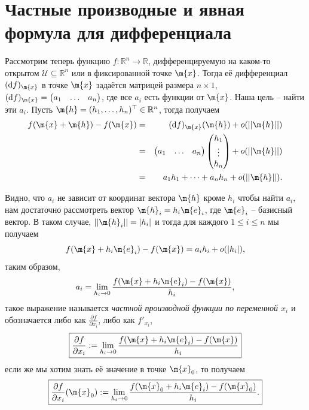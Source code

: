 \section{Частные производные и явная формула для дифференциала}

Рассмотрим теперь функцию $f:\mathbb{R}^n \to \mathbb{R}$, дифференцируемую на каком-то открытом $\mathscr{U} \subseteq \mathbb{R}^n$ или в фиксированной точке $\m{x}$. Тогда её дифференциал $(\mathrm{d}f)_\m{x}$ в точке $\m{x}$ задаётся матрицей размера $n\times 1$, $(\mathrm{d}f)_\m{x} = \begin{pmatrix}
    a_1 & \ldots & a_n
\end{pmatrix}$, где все $a_i$ есть функции от $\m{x}$. Наша цель -- найти эти $a_i$. Пусть $\m{h} = (h_1, \ldots, h_n)^\top \in \mathbb{R}^n$, тогда получаем
\begin{eqnarray*}
    f(\m{x} + \m{h}) - f(\m{x}) &=& (\mathrm{d}f)_\m{x}(\m{h}) + o(||\m{h}||) \\
    &=& \begin{pmatrix}
        a_1 & \ldots & a_n
    \end{pmatrix} \begin{pmatrix}
        h_1 \\ \vdots \\ h_n  \end{pmatrix} + o(||\m{h}||) \\
        &=& a_1h_1 + \cdots + a_nh_n + o(||\m{h}||).
\end{eqnarray*}

Видно, что $a_i$ не зависит от координат вектора $\m{h}$ кроме $h_i$ \ie чтобы найти $a_i$, нам достаточно рассмотреть вектор $\m{h}_i = h_i \m{e}_i$, где $\m{e}_i$ -- базисный вектор. В таком случае, $||\m{h}_i|| = |h_i|$ и тогда для каждого $1 \le i \le n$ мы получаем
\[
 f(\m{x} + h_i \m{e}_i) - f(\m{x}) = a_ih_i + o(|h_i|),
\]
таким образом, 
\[
 a_i = \lim_{h_i \to 0} \frac{f(\m{x} + h_i \m{e}_i) - f(\m{x})}{h_i},
\]
такое выражение называется \textit{частной производной функции по переменной $x_i$} и обозначается либо как $\frac{\partial f}{\partial x_i}$, либо как $f'_{x_i}$, \ie 
\begin{equation}\label{partial_i}
  \boxed{
 \frac{\partial f}{\partial x_i}: = \lim_{h_i \to 0} \frac{f(\m{x} + h_i \m{e}_i) - f(\m{x})}{h_i}}    
\end{equation}
если же мы хотим знать её значение в точке $\m{x}_0$, то получаем
\begin{equation}\label{partial_i(o)}
    \boxed{
      \frac{\partial f}{\partial x_i}(\m{x}_0): = \lim_{h_i \to 0} \frac{f(\m{x}_0 + h_i \m{e}_i) - f(\m{x}_0)}{h_i}.
    }
\end{equation}

